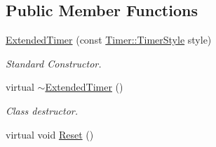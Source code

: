 \subsection*{Public Member Functions}
\begin{DoxyCompactItemize}
\item 
\hyperlink{classphys_1_1ExtendedTimer_a5dfd8368d6fa8b69ca8ab23b2d3ba69e}{ExtendedTimer} (const \hyperlink{classphys_1_1Timer_a1ee86bf43e20329d750c5d582dcce329}{Timer::TimerStyle} style)
\begin{DoxyCompactList}\small\item\em Standard Constructor. \item\end{DoxyCompactList}\item 
\hypertarget{classphys_1_1ExtendedTimer_a7a9ce42ffda17cbe366adde1688120af}{
virtual \hyperlink{classphys_1_1ExtendedTimer_a7a9ce42ffda17cbe366adde1688120af}{$\sim$ExtendedTimer} ()}
\label{dc/d7c/classphys_1_1ExtendedTimer_a7a9ce42ffda17cbe366adde1688120af}

\begin{DoxyCompactList}\small\item\em Class destructor. \item\end{DoxyCompactList}\item 
\hypertarget{classphys_1_1ExtendedTimer_a33f0cb87c37031ec54b99d09a522bafb}{
virtual void \hyperlink{classphys_1_1ExtendedTimer_a33f0cb87c37031ec54b99d09a522bafb}{Reset} ()}
\label{dc/d7c/classphys_1_1ExtendedTimer_a33f0cb87c37031ec54b99d09a522bafb}


\end{DoxyCompactItemize}
